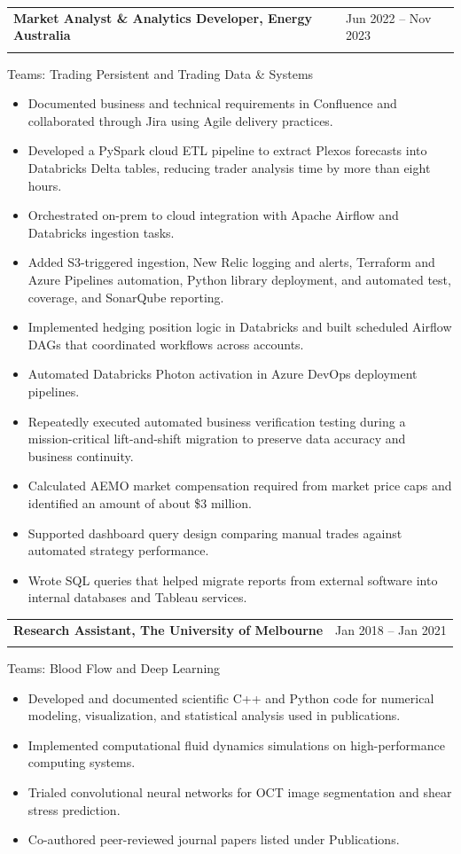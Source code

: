 \documentclass[10pt,a4paper]{article}
\makeatletter
\newenvironment{resumejob}[3]{
  \par\addvspace{0.45em}
  \noindent\begin{tabularx}{\textwidth}{@{}>{\raggedright\arraybackslash}X>{\raggedleft\arraybackslash}p{0.3\textwidth}@{}}
    \textbf{\textcolor{textdark}{#1}} & \textcolor{mutedtext}{#2} \\
    \multicolumn{2}{@{}l@{}}{\textit{\textcolor{mutedtext}{#3}}}
  \end{tabularx}
  \vspace{-0.55em}
}{
  \par\addvspace{0.2em}
}
\makeatother
\begin{document}
\begin{resumejob}{Market Analyst \& Analytics Developer, Energy Australia}{Jun 2022 -- Nov 2023}{Melbourne}
Teams: Trading Persistent and Trading Data \& Systems
\begin{itemize}
  \item Documented business and technical requirements in Confluence and collaborated through Jira using Agile delivery practices.
  \item Developed a PySpark cloud ETL pipeline to extract Plexos forecasts into Databricks Delta tables, reducing trader analysis time by more than eight hours.
  \item Orchestrated on-prem to cloud integration with Apache Airflow and Databricks ingestion tasks.
  \item Added S3-triggered ingestion, New Relic logging and alerts, Terraform and Azure Pipelines automation, Python library deployment, and automated test, coverage, and SonarQube reporting.
  \item Implemented hedging position logic in Databricks and built scheduled Airflow DAGs that coordinated workflows across accounts.
  \item Automated Databricks Photon activation in Azure DevOps deployment pipelines.
  \item Repeatedly executed automated business verification testing during a mission-critical lift-and-shift migration to preserve data accuracy and business continuity.
  \item Calculated AEMO market compensation required from market price caps and identified an amount of about \$3 million.
  \item Supported dashboard query design comparing manual trades against automated strategy performance.
  \item Wrote SQL queries that helped migrate reports from external software into internal databases and Tableau services.
\end{itemize}
\end{resumejob}

\begin{resumejob}{Research Assistant, The University of Melbourne}{Jan 2018 -- Jan 2021}{Melbourne}
Teams: Blood Flow and Deep Learning
\begin{itemize}
  \item Developed and documented scientific C++ and Python code for numerical modeling, visualization, and statistical analysis used in publications.
  \item Implemented computational fluid dynamics simulations on high-performance computing systems.
  \item Trialed convolutional neural networks for OCT image segmentation and shear stress prediction.
  \item Co-authored peer-reviewed journal papers listed under Publications.
\end{itemize}
\end{resumejob}
\end{document}
